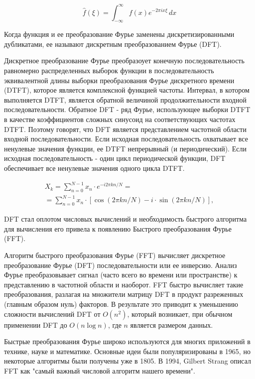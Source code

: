 \documentclass[14pt, a4paper]{article}
\numberwithin{figure}{section}
\numberwithin{equation}{section}
\begin{document}
$$\hat{f}(\xi) =\int_{-\infty}^{\infty}f(x)e^{-2\pi ix\xi }\,dx$$

Когда функция и ее преобразование Фурье заменены дискретизированными дубликатами, ее называют дискретным преобразованием Фурье (DFT). 

Дискретное преобразование Фурье преобразоует конечную последовательность равномерно распределенных выборок функции в последовательность эквивалентной длины выборки преобразования Фурье дискретного времени (DTFT), которое является комплексной функцией частоты. Интервал, в котором выполняется DTFT, является обратной величиной продолжительности входной последовательности. Обратное DFT - ряд Фурье, использующее выборки DTFT в качестве коэффициентов сложных синусоид на соответствующих частотах DTFT. Поэтому говорят, что DFT является представлением частотной области входной последовательности. Если исходная последовательность охватывает все ненулевые значения функции, ее DTFT непрерывный (и периодический). Если исходная последовательность - один цикл периодической функции, DFT обеспечивает все ненулевые значения одного цикла DTFT.

\begin{eqnarray}
X_{k}=\sum _{n=0}^{N-1}x_{n}\cdot e^{-i2\pi kn/N}= \nonumber \\
=\sum _{n=0}^{N-1}x_{n}\cdot [\cos(2\pi kn/N)-i\cdot \sin(2\pi kn/N)]\nonumber,
\end{eqnarray}


DFT стал оплотом числовых вычислений и необходимость быстрого алгоритма для вычисления его привела к появлению Быстрого преобразования Фурье (FFT).

Алгоритм быстрого преобразования Фурье (FFT) вычисляет дискретное преобразование Фурье (DFT) последовательности или ее инверсию. Анализ Фурье преобразовывает сигнал (часто всего во времени или пространстве) к представлению в частотной области и наоборот. FFT быстро вычисляет такие преобразования, разлагая на множители матрицу DFT в продукт разреженных (главным образом нуль) факторов. В результате это приводит к уменьшению сложности вычислений DFT от $ O (n^ {2})$, который возникает, при обычном применении DFT до $O (n\log n)$, где $ n $  является размером данных.

Быстрые преобразования Фурье широко используются для многих приложений в технике, науке и математике. Основные идеи были популяризированы в 1965, но некоторые алгоритмы были получены уже в 1805. В 1994, Gilbert Strang описал FFT как "самый важный числовой алгоритм нашего времени".
\end{document}
